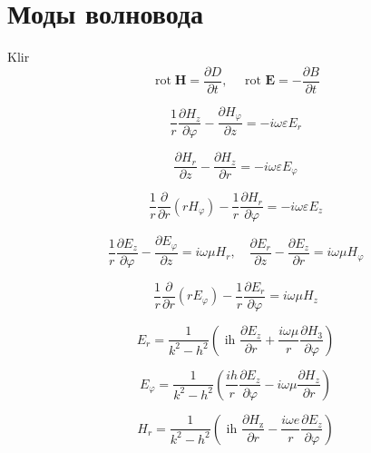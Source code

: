 \section{Моды волновода}
Klir
\begin{equation}
\operatorname{rot} \mathbf{H}=\frac{\partial D}{\partial t}, \quad \text { rot } \mathbf{E}=-\frac{\partial B}{\partial t}
\end{equation}

\begin{equation}\frac{1}{r} \frac{\partial H_{z}}{\partial \varphi}-\frac{\partial H_{\varphi}}{\partial z}=-i \omega \varepsilon E_{r}
\end{equation}

\begin{equation}
 \frac{\partial H_{r}}{\partial z}-\frac{\partial H_{z}}{\partial r}=-i \omega \varepsilon E_{\varphi}
\end{equation}
 
\begin{equation}\frac{1}{r} \frac{\partial}{\partial r}\left(r H_{\varphi}\right)-\frac{1}{r} \frac{\partial H_{r}}{\partial \varphi}=-i \omega \varepsilon E_{z}
\end{equation}

\begin{equation}\frac{1}{r} \frac{\partial E_{z}}{\partial \varphi}-\frac{\partial E_{\varphi}}{\partial z}=i \omega \mu H_{r}, \quad \frac{\partial E_{r}}{\partial z}-\frac{\partial E_{z}}{\partial r}=i \omega \mu H_{\varphi}
\end{equation}

\begin{equation}\frac{1}{r} \frac{\partial}{\partial r}\left(r E_{\varphi}\right)-\frac{1}{r} \frac{\partial E_{r}}{\partial \varphi}=i \omega \mu H_{z}
\end{equation}


\begin{equation}
E_{r}=\frac{1}{k^{2}-h^{2}}\left(\text { ih } \frac{\partial E_{z}}{\partial r}+\frac{i \omega \mu}{r} \frac{\partial H_{3}}{\partial \varphi}\right) 
\end{equation}

\begin{equation}
E_{\varphi}=\frac{1}{k^{2}-h^{2}}\left(\frac{i h}{r} \frac{\partial E_{z}}{\partial \varphi}-i \omega \mu \frac{\partial H_{z}}{\partial r}\right)
\end{equation}

 
 \begin{equation}
 H_{r}=\frac{1}{k^{2}-h^{2}}\left(\text { ih } \frac{\partial H_{\mathrm{z}}}{\partial r}-\frac{i \omega e}{r} \frac{\partial E_{z}}{\partial \varphi}\right)
 \end{equation}
  
